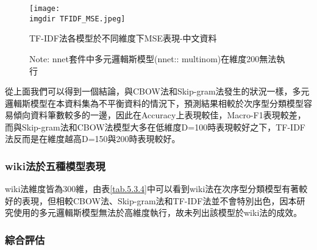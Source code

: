 	
\begin{figure}[H]
    \centering
        \texttt{[image: \\imgdir TFIDF\_MSE.jpeg]}
    \caption{TF-IDF法各模型於不同維度下MSE表現-中文資料}
    \label{pic.5.3.3-3}
    \caption*{\footnotesize{Note: nnet套件中多元邏輯斯模型(nnet:: multinom)在維度200無法執行}}
\end{figure}	
	
	從上面我們可以得到一個結論，與CBOW法和Skip-gram法發生的狀況一樣，多元邏輯斯模型在本資料集為不平衡資料的情況下，預測結果相較於次序型分類模型容易傾向資料筆數較多的一邊，因此在Accuracy上表現較佳，Macro-F1表現較差，而與Skip-gram法和CBOW法模型大多在低維度D=100時表現較好之下，TF-IDF法反而是在維度越高D=150與200時表現較好。
	
\subsubsection{wiki法於五種模型表現}
	
	wiki法維度皆為300維，由表\ref{tab.5.3.4}中可以看到wiki法在次序型分類模型有著較好的表現，但相較CBOW法、Skip-gram法和TF-IDF法並不會特別出色，因本研究使用的多元邏輯斯模型無法於高維度執行，故未列出該模型於wiki法的成效。
	
\begin{table}[H]
	\footnotesize
    \centering
    \extrarowheight=5pt
    \caption{Wiki法於五種分類模型之比較-中文資料}\label{tab.5.3.4}
\end{table}
	
	
\newpage

\subsubsection{綜合評估}

